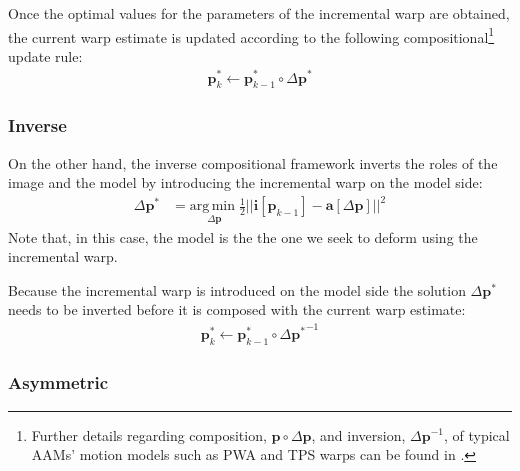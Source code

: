 Once the optimal values for the parameters of the incremental warp are obtained, the current warp estimate is updated according to the following compositional\footnote{\label{foot:warp}Further details regarding composition, $\mathbf{p} \circ \Delta \mathbf{p}$, and inversion, $\Delta \mathbf{p}^{-1}$, of typical AAMs' motion models such as PWA and TPS warps can be found in \cite{Matthews2004, Papandreou2008}.} update rule:
\begin{equation}
 	\begin{aligned}
    	\mathbf{p}_k^* \leftarrow \mathbf{p}_{k-1}^* \circ \Delta \mathbf{p}^*
    \label{eq:fc_update}
    \end{aligned}
\end{equation}

\subsubsection{Inverse}
\label{sec:inverse}

On the other hand, the inverse compositional framework inverts the roles of the image and the model by introducing the incremental warp on the model side:
\begin{equation}
    \begin{aligned}
        \Delta \mathbf{p}^* & = \underset{\Delta \mathbf{p}} {\mathrm{arg\, min\;}} \frac{1}{2}|| \mathbf{i}[\mathbf{p}_{k-1}] - \mathbf{a} [\Delta \mathbf{p}] ||^2
    \label{eq:ssd_ic}
    \end{aligned}
\end{equation}
Note that, in this case, the model is the the one we seek to deform using the incremental warp.

Because the incremental warp is introduced on the model side the solution $\Delta \mathbf{p}^*$ needs to be inverted before it is composed with the current warp estimate:
\begin{equation}
 	\begin{aligned}
    	\mathbf{p}_k^* \leftarrow \mathbf{p}_{k-1}^* \circ \Delta {\mathbf{p}^*}^{-1} 
    \label{eq:ic_update}
    \end{aligned}
\end{equation}

\subsubsection{Asymmetric}
\label{sec:asymmetric}


